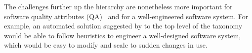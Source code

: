 The challenges further up the hierarchy are nonetheless more important for software quality attributes (QA)~\cite{Ernst2017} and for a well-engineered software system.
For example, an automated solution suggested by \cct{} to the top level of the taxonomy would be able to follow heuristics to engineer a well-designed software system, which would be easy to modify and scale to sudden changes in use.